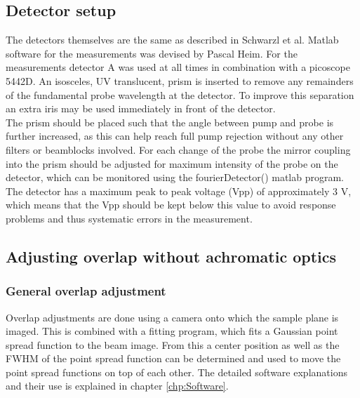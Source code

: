 \documentclass[twoside,openright]{scrreprt}
\begin{document}
\subsection{Detector setup}
The detectors themselves are the same as described in Schwarzl et al.\cite{Schwarzl2022} Matlab software for the measurements was devised by Pascal Heim. For the measurements detector A was used at all times in combination with a picoscope 5442D. An isosceles, UV translucent, prism is inserted to remove any remainders of the fundamental probe wavelength at the detector. To improve this separation an extra iris may be used immediately in front of the detector.\\
The prism should be placed such that the angle between pump and probe is further increased, as this can help reach full pump rejection without any other filters or beamblocks involved. For each change of the probe the mirror coupling into the prism should be adjusted for maximum intensity of the probe on the detector, which can be monitored using the fourierDetector() matlab program.\\
The detector has a maximum peak to peak voltage (Vpp) of approximately 3 V, which means that the Vpp should be kept below this value to avoid response problems and thus systematic errors in the measurement.
\subsection{Adjusting overlap without achromatic optics}

\subsubsection{General overlap adjustment}
Overlap adjustments are done using a camera onto which the sample plane is imaged. This is combined with a fitting program, which fits a Gaussian point spread function to the beam image. From this a center position as well as the FWHM of the point spread function can be determined and used to move the point spread functions on top of each other. The detailed software explanations and their use is explained in chapter \ref{chp:Software}.
\end{document}
